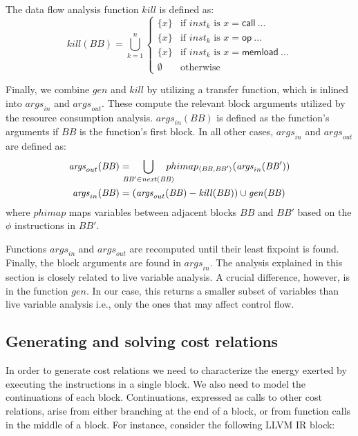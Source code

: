 \documentclass[9pt,preprint]{sigplanconf}
\newcommand{\mathspace}[1]{\ensuremath{#1}\xspace}
\newcommand{\instit}[1]{\mathspace{\mathsf{#1}}}
\newcommand{\tuple}[2]{\mathspace{\langle #1, #2 \rangle}}
\newcommand{\aBlock}{\mathspace{\mathit{BB}}}
\newcommand{\Gen}{\mathspace{\mathit{gen}}}
\newcommand{\Kill}{\mathspace{\mathit{kill}}}
\newcommand{\inst}{\mathspace{\mathit{inst}}}
\newcommand{\args}{\mathspace{\mathit{args}}}
\newcommand{\flownext}{\mathspace{\mathit{next}}}
\newcommand{\op}{\instit{op}}
\newcommand{\memload}{\instit{memload}}
\newcommand{\call}{\instit{call}}
\newcommand{\seclabel}[1]{\label{sec:#1}}
\begin{document}
\noindent
The data flow analysis function \Kill is defined as:
\begin{equation*}
\Kill(\aBlock)=\bigcup\limits_{k=1}^n
\begin{cases}
\{x\} &\text{if }\inst_k \text{ is } x=\call~\ldots\\
\{x\} &\text{if }\inst_k \text{ is } x=\op~\ldots\\
\{x\} &\text{if }\inst_k \text{ is } x=\memload~\ldots\\
\emptyset & \text{otherwise}
\end{cases}
\end{equation*}

Finally, we combine $\Gen$ and $\Kill$ by utilizing a transfer function, which
is inlined into $\args_{in}$ and $\args_{out}$. These compute the relevant block
arguments utilized by the resource consumption analysis. $\args_{in}(\aBlock)$ is defined as
the function's arguments if \aBlock is the function's first block. In all other
cases, $\args_{in}$ and $\args_{out}$ are defined as:
\begin{align*}
\args_{out}(\aBlock) &=
  \kern-1em\bigcup\limits_{\aBlock'\in\flownext(\aBlock)}\kern-1em phimap_{\tuple{\aBlock}{\aBlock'}}(\args_{in}(\aBlock'))\\
\args_{in}(\aBlock)&=(\args_{out}(\aBlock)-\Kill(\aBlock)) \cup \Gen(\aBlock)
\end{align*}
where $phimap$ maps variables between adjacent blocks \aBlock and $\aBlock'$
based on the $\phi$ instructions in $\aBlock'$.

Functions $\args_{in}$ and $\args_{out}$ are recomputed until their
least fixpoint is found. Finally, the block arguments are found in $\args_{in}$.
The analysis explained in this section is closely related to live variable
analysis. A crucial difference, however, is in the function \Gen. In our case,
this returns a smaller subset of variables than live variable analysis i.e.,
only the ones that may affect control flow.

\subsection{Generating and solving cost relations}
\seclabel{CRs}
In order to generate cost relations we
need to characterize the energy exerted by executing the instructions in a
single block. We also need to model the continuations of each
block. Continuations, expressed as calls to other cost relations, arise from
either branching at the end of a block, or from function calls in the middle of a
block. For instance, consider the following LLVM IR block:
\end{document}
